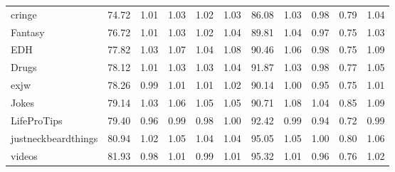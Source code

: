 \begin{tabular}{lrrrrrrrrrr}
cringe              &          74.72 &                1.01 &                1.03 &                1.02 &                1.03 &                 86.08 &                       1.03 &                       0.98 &                       0.79 &                       1.04 \\
Fantasy             &          76.72 &                1.01 &                1.03 &                1.02 &                1.04 &                 89.81 &                       1.04 &                       0.97 &                       0.75 &                       1.03 \\
EDH                 &          77.82 &                1.03 &                1.07 &                1.04 &                1.08 &                 90.46 &                       1.06 &                       0.98 &                       0.75 &                       1.09 \\
Drugs               &          78.12 &                1.01 &                1.03 &                1.03 &                1.04 &                 91.87 &                       1.03 &                       0.98 &                       0.77 &                       1.05 \\
exjw                &          78.26 &                0.99 &                1.01 &                1.01 &                1.02 &                 90.14 &                       1.00 &                       0.95 &                       0.75 &                       1.01 \\
Jokes               &          79.14 &                1.03 &                1.06 &                1.05 &                1.05 &                 90.71 &                       1.08 &                       1.04 &                       0.85 &                       1.09 \\
LifeProTips         &          79.40 &                0.96 &                0.99 &                0.98 &                1.00 &                 92.42 &                       0.99 &                       0.94 &                       0.72 &                       0.99 \\
justneckbeardthings &          80.94 &                1.02 &                1.05 &                1.04 &                1.04 &                 95.05 &                       1.05 &                       1.00 &                       0.80 &                       1.06 \\
videos              &          81.93 &                0.98 &                1.01 &                0.99 &                1.01 &                 95.32 &                       1.01 &                       0.96 &                       0.76 &                       1.02 \\

\end{tabular}
